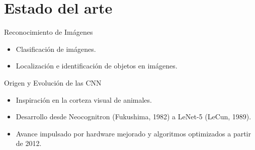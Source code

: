 \section{Estado del arte}

\begin{frame}
    \vspace*{-0.5cm}
    \begin{block}{Reconocimiento de Imágenes}
        \begin{itemize}
            \item Clasificación de imágenes.
            \item Localización e identificación de objetos en imágenes.
        \end{itemize}
    \end{block}
    \pause
    \begin{block}{Origen y Evolución de las CNN}
        \begin{itemize}
            \item Inspiración en la corteza visual de animales.
            \item Desarrollo desde Neocognitron (Fukushima, 1982) a LeNet-5 (LeCun, 1989).
            \item Avance impulsado por hardware mejorado y algoritmos optimizados a partir de 2012.
        \end{itemize}
    \end{block}
\end{frame}

